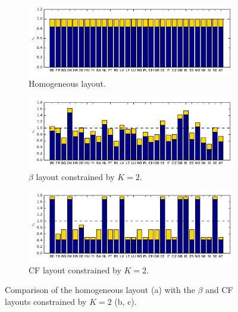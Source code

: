 \documentclass[a4paper, 5p, sort&compress]{elsarticle}%
\newcommand{\chromowidth}{1.00 \columnwidth}
\begin{document}
\begin{figure}[p!]
  \centering
  \begin{subfigure}{2\columnwidth}
    \includegraphics[width = \chromowidth, center]{chromosome_homogeneous}
    \caption{Homogeneous layout.}
    \label{fig:betaOpt}
  \end{subfigure}
  \begin{subfigure}{2\columnwidth}
    \includegraphics[width = \chromowidth, center]{chromosome_k=2beta}
    \caption{$\beta$ layout constrained by $K = 2$.}
    \label{fig:cfMaxOpt}
  \end{subfigure}
  \begin{subfigure}{2\columnwidth}
    \includegraphics[width = \chromowidth, center]{chromosome_k=2cfMax}
    \caption{CF layout constrained by $K = 2$.}
    \label{fig:agdOpt}
  \end{subfigure}
  \caption{Comparison of the homogeneous layout (a) with the $\beta$
    and CF layouts constrained by $K = 2$ (b, c). }
  \label{fig:k=2layouts}
\end{figure}
\end{document}
